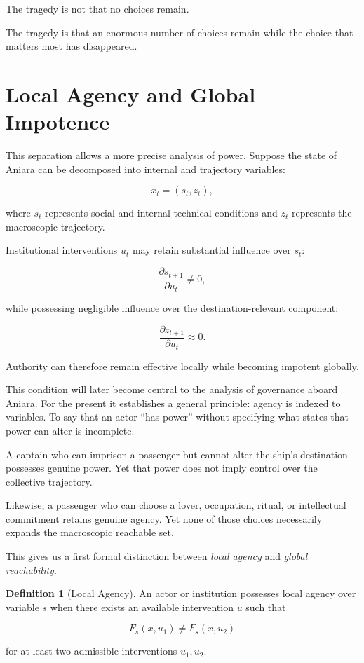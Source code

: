 \documentclass[11pt,oneside]{book}
\theoremstyle{definition}
\newtheorem{definition}[theorem]{Definition}
\theoremstyle{remark}
\begin{document}
The tragedy is not that no choices remain.

The tragedy is that an enormous number of choices remain while the choice that matters most has disappeared.

\section{Local Agency and Global Impotence}

This separation allows a more precise analysis of power. Suppose the state of Aniara can be decomposed into internal and trajectory variables:

\[
x_t=(s_t,z_t),
\]

where \(s_t\) represents social and internal technical conditions and \(z_t\) represents the macroscopic trajectory.

Institutional interventions \(u_t\) may retain substantial influence over \(s_t\):

\[
\frac{\partial s_{t+1}}{\partial u_t}\neq0,
\]

while possessing negligible influence over the destination-relevant component:

\[
\frac{\partial z_{t+1}}{\partial u_t}\approx0.
\]

Authority can therefore remain effective locally while becoming impotent globally.

This condition will later become central to the analysis of governance aboard Aniara. For the present it establishes a general principle: agency is indexed to variables. To say that an actor ``has power'' without specifying what states that power can alter is incomplete.

A captain who can imprison a passenger but cannot alter the ship's destination possesses genuine power. Yet that power does not imply control over the collective trajectory.

Likewise, a passenger who can choose a lover, occupation, ritual, or intellectual commitment retains genuine agency. Yet none of those choices necessarily expands the macroscopic reachable set.

This gives us a first formal distinction between \emph{local agency} and \emph{global reachability}.

\begin{definition}[Local Agency]
An actor or institution possesses local agency over variable \(s\) when there exists an available intervention \(u\) such that

\[
F_s(x,u_1)\neq F_s(x,u_2)
\]

for at least two admissible interventions \(u_1,u_2\).
\end{definition}
\end{document}
